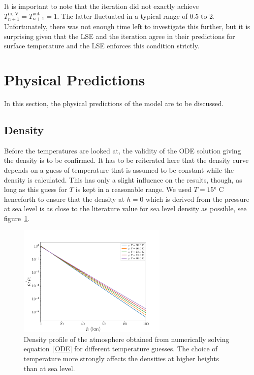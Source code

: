 \documentclass[a4paper,DIV=12,english]{scrartcl}
\begin{document}
It is important to note that the iteration did not exactly achieve $T_{n+1}^{\text{in, V}} = T_{n+1}^{\text{out}} = 1$. The latter fluctuated in a typical range of 0.5 to 2. Unfortunately, there was not enough time left to investigate this further, but it is surprising given that the LSE and the iteration agree in their predictions for surface temperature and the LSE enforces this condition strictly.

\section{Physical Predictions}
In this section, the physical predictions of the model are to be discussed.

\subsection{Density}
Before the temperatures are looked at, the validity of the ODE solution giving the density is to be confirmed. It has to be reiterated here that the density curve depends on a guess of temperature that is assumed to be constant while the density is calculated. This has only a slight influence on the results, though, as long as this guess for $T$ is kept in a reasonable range. We used $T=15\text{° C}$ henceforth to ensure that the density at $h=0$ which is derived from the pressure at sea level is as close to the literature value for sea level density as possible, see figure~\ref{fig:density}.
\begin{figure}
    \centering
    \includegraphics[width=0.65\textwidth]{../plots/density/density.pdf}
    \caption{Density profile of the atmosphere obtained from numerically solving equation~\eqref{ODE} for different temperature guesses. The choice of temperature more strongly affects the densities at higher heights than at sea level.}
    \label{fig:density}
\end{figure}
\end{document}
